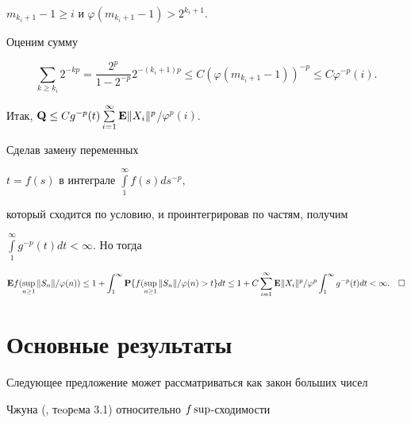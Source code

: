 $m_{k_{i} +1} -1\ge i$ и $\varphi (m_{k_{i} +1} -1)> 2^{k_{i} +1} $.





Оценим сумму


$$


\sum_{k\ge k_{i} } 2^{-kp} =\frac{2^p}{1 - 2^{-p} }


2^{-(k_{i} +1)p}


\le C(\varphi (m_{k_{i} +1} -1))^{-p} \le C\varphi ^{-p} (i).


$$





Итак, ${\bold Q} \le Cg^{-p} (t)\sum\limits^{\infty }_{i=1}


{\bold E} \| X_{i} \| ^{p} $/$\varphi ^{p} (i)$.





Сделав замену переменных


$t=f(s)$ в интеграле $\int\limits_1^{\infty}f(s)ds^{-p} $,


который сходится по условию, и проинтегрировав по частям, получим


$\int\limits_1^{\infty}g^{-p} (t)dt<\infty $. Но тогда


$$


{\bold E}


f(\sup_{n\ge 1}\| S_{n} \| /\varphi (n))


\le 1 +\int_1^{\infty}


{\bold P} \{f(\sup_{n\ge 1}


\| S_{n} \| /\varphi (n)>t\}dt 


\le 1 + C\sum^{\infty }_{i=1}


{\bold E} \| X_{i} \| ^{p}/


\varphi ^{p} \int_1^{\infty} g^{-p} (t)dt<\infty.\quad\square


$$





\section{Основные результаты}





Следующее предложение может рассматриваться как закон больших чисел


Чжуна (\cite{Hof}, тeoрeма 3.1) относительно $f\sup$-сходимости


